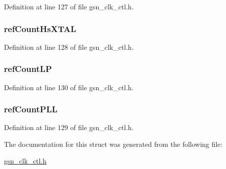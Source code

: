 Definition at line 127 of file gsn\_\-clk\_\-ctl.h.

\hypertarget{a00039_abbc5b430ee0af80605a63e15113d9ff2}{
\subsubsection[{refCountHsXTAL}]{ {\bf refCountHsXTAL}}}
\label{a00039_abbc5b430ee0af80605a63e15113d9ff2}


Definition at line 128 of file gsn\_\-clk\_\-ctl.h.

\hypertarget{a00039_afa083078d88cb45aba0849e5faf4eda1}{
\subsubsection[{refCountLP}]{ {\bf refCountLP}}}
\label{a00039_afa083078d88cb45aba0849e5faf4eda1}


Definition at line 130 of file gsn\_\-clk\_\-ctl.h.

\hypertarget{a00039_a4ed9595eb4009f786890647770869c2f}{
\subsubsection[{refCountPLL}]{ {\bf refCountPLL}}}
\label{a00039_a4ed9595eb4009f786890647770869c2f}


Definition at line 129 of file gsn\_\-clk\_\-ctl.h.



The documentation for this struct was generated from the following file:\begin{DoxyCompactItemize}
\item 
\hyperlink{a00477}{gsn\_\-clk\_\-ctl.h}\end{DoxyCompactItemize}
